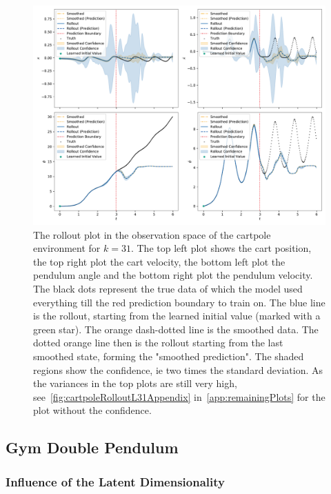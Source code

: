 			\begin{figure}
				\centering
				\includegraphics[width=\linewidth]{figures/results/cartpole-gym/run-latent-dim-31/rollout-observations-N0.pdf}
				\caption{The rollout plot in the observation space of the cartpole environment for \(k = 31\). The top left plot shows the cart position, the top right plot the cart velocity, the bottom left plot the pendulum angle and the bottom right plot the pendulum velocity. The black dots represent the true data of which the model used everything till the red prediction boundary to train on. The blue line is the rollout, starting from the learned initial value (marked with a green star). The orange dash-dotted line is the smoothed data. The dotted orange line then is the rollout starting from the last smoothed state, forming the "smoothed prediction". The shaded regions show the confidence, \ac{ie} two times the standard deviation. As the variances in the top plots are still very high, see~\autoref{fig:cartpoleRolloutL31Appendix} in~\autoref{app:remainingPlots} for the plot without the confidence.}
				\label{fig:cartpoleRolloutL31}
			\end{figure}

	\subsection{Gym Double Pendulum}

		\subsubsection{Influence of the Latent Dimensionality}
